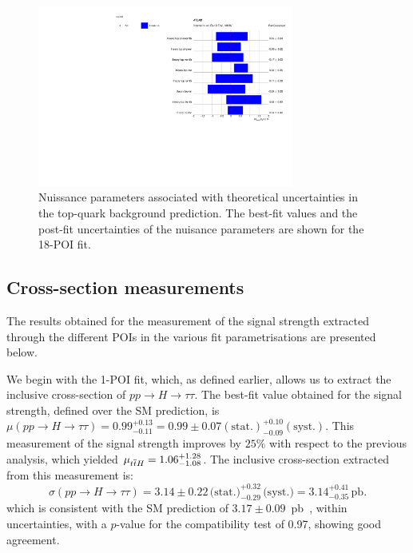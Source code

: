 \begin{figure}[htbp]
  \centering
  \includegraphics[width=0.75\textwidth]{images/fit_stxs/STXS_combine_all_xs_NP_theory_top.pdf}
  \caption{Nuissance parameters associated with theoretical uncertainties in the top-quark background prediction. The best-fit values and the post-fit uncertainties
  of the nuisance parameters are shown for the 18-POI fit.}
  \label{fig:constraint_theory_top}
\end{figure}


\subsection{Cross-section measurements}
\label{xsect}

The results obtained for the measurement of the signal strength extracted through the different POIs in the various fit parametrisations are presented below. 

We begin with the 1-POI fit, which, as defined earlier, allows us to extract the inclusive cross-section of $pp \to H \to \tau \tau$. The best-fit value obtained for the signal strength, defined over the SM prediction, is 
$\mu(pp \to H \to \tau \tau) = 0.99^{+0.13}_{-0.11} = 0.99 \pm 0.07 (\text{stat.})^{+0.10}_{-0.09}(\text{syst.})$. 
This measurement of the signal strength improves by $25\%$ with respect to the previous analysis, which yielded $\mu_{t\overline{t}H} = 1.06^{+1.28}_{-1.08}$. The inclusive cross-section extracted from this measurement is:
\begin{equation}
  \sigma(pp \to H \to \tau\tau) 
  = 3.14 \pm 0.22 \, \text{(stat.)}^{+0.32}_{-0.29} \, \text{(syst.)} 
  = 3.14^{+0.41}_{-0.35} \, \text{pb}.
  \label{eq:htautau_xs}
  \end{equation}
  which is consistent with the SM prediction of $3.17 \pm 0.09$~pb~\cite{https://doi.org/10.23731/cyrm-2017-002}, within uncertainties, with a $p$-value for the compatibility test of 0.97, showing good agreement. 

